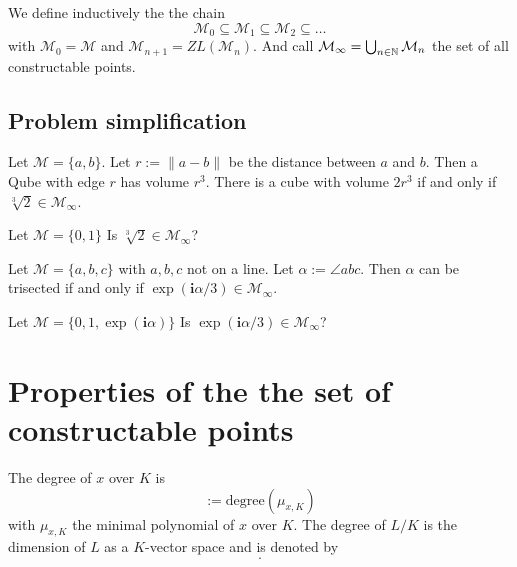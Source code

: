 \documentclass{../Project/TemplateExercise}
\begin{document}
\begin{definition}
    We define inductively the the chain
    \begin{equation*}
        \mathcal{M}_0 \subseteq \mathcal{M}_1 \subseteq \mathcal{M}_2 \subseteq \dots
    \end{equation*}
    with $\mathcal{M}_0 = \mathcal{M}$ and $\mathcal{M}_{n+1} = ZL(\mathcal{M}_n)$.\newline
    And call $\mathcal{M}_{\infty} = \bigcup_{n \in \mathbb{N}} \mathcal{M}_n$ the set of all constructable points.
\end{definition}

\subsection{Problem simplification}
Let $\mathcal{M} = \{a, b\}$. Let $r := \|a - b\|$ be the distance between $a$ and $b$. Then a Qube with edge $r$ has volume $r^3$.
There is a cube with volume $2r^3$ if and only if $\sqrt[3]{2} \in \mathcal{M}_{\infty}$.
\begin{problem}
    Let $\mathcal{M} = \{0,1\}$ Is $\sqrt[3]{2} \in \mathcal{M}_{\infty}$?
\end{problem}
Let $\mathcal{M} = \{a, b, c\}$ with $a, b, c$ not on a line. Let $\alpha := \angle abc$.
Then $\alpha$ can be trisected if and only if $\exp(\textbf{i}\alpha / 3) \in \mathcal{M}_{\infty}$.
\begin{problem}
    Let $\mathcal{M} = \{0,1,\exp(\textbf{i} \alpha)\}$ Is $\exp(\textbf{i} \alpha/3) \in \mathcal{M}_{\infty}$?
\end{problem}


\section{Properties of the the set of constructable points}
\begin{definition}
    The degree of $x$ over $K$ is
    \begin{equation*}
        [x:K] :=\text{degree}(\mu_{x,K})
        \end{equation*}
        with $\mu_{x,K}$ the minimal polynomial of $x$ over $K$. \newline
    The degree of $L/K$ is the dimension of $L$ as a $K$-vector space and is denoted by
    \begin{equation*}
        [L:K].
    \end{equation*}
\end{definition}
\end{document}
